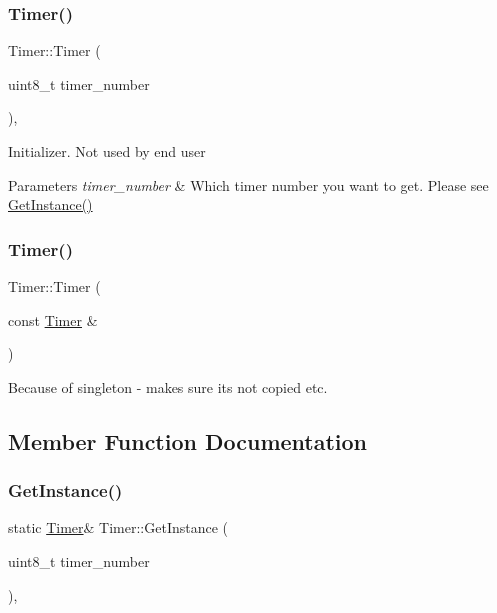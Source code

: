 \subsubsection{\texorpdfstring{Timer()}{Timer()}\hspace{0.1cm}{\footnotesize\ttfamily [1/2]}}
{\footnotesize\ttfamily Timer\+::\+Timer (\begin{DoxyParamCaption}\item[{uint8\+\_\+t}]{timer\+\_\+number }\end{DoxyParamCaption})\hspace{0.3cm}{\ttfamily [inline]}, {\ttfamily [private]}}

Initializer. Not used by end user 
\begin{DoxyParams}{Parameters}
{\em timer\+\_\+number} & Which timer number you want to get. Please see \hyperlink{class_timer_a5a9960ef2a5394a76b4b024cae1a86a3}{Get\+Instance()} \\
\hline
\end{DoxyParams}
\hypertarget{class_timer_ae6b73141ad1d5029d3782d14d2fd5ff0}{}\label{class_timer_ae6b73141ad1d5029d3782d14d2fd5ff0} 
\subsubsection{\texorpdfstring{Timer()}{Timer()}\hspace{0.1cm}{\footnotesize\ttfamily [2/2]}}
{\footnotesize\ttfamily Timer\+::\+Timer (\begin{DoxyParamCaption}\item[{const \hyperlink{class_timer}{Timer} \&}]{ }\end{DoxyParamCaption})\hspace{0.3cm}{\ttfamily [delete]}}

Because of singleton -\/ makes sure its not copied etc. 

\subsection{Member Function Documentation}
\hypertarget{class_timer_a5a9960ef2a5394a76b4b024cae1a86a3}{}\label{class_timer_a5a9960ef2a5394a76b4b024cae1a86a3} 
\subsubsection{\texorpdfstring{Get\+Instance()}{GetInstance()}}
{\footnotesize\ttfamily static \hyperlink{class_timer}{Timer}\& Timer\+::\+Get\+Instance (\begin{DoxyParamCaption}\item[{uint8\+\_\+t}]{timer\+\_\+number }\end{DoxyParamCaption})\hspace{0.3cm}{\ttfamily [inline]}, {\ttfamily [static]}}

